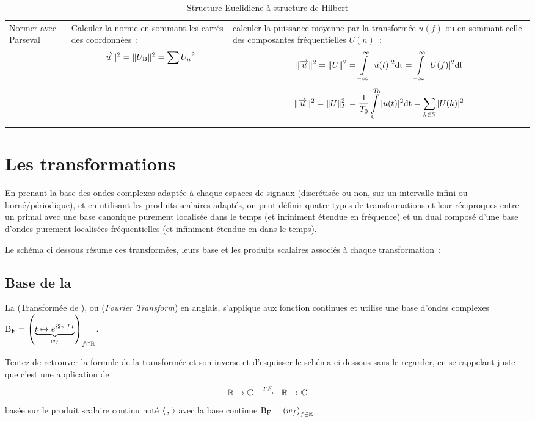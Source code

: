 \begin{table}[!ht]
\begin{tabular}{p{}|p{}|p{}}
  Normer avec Parseval  &  Calculer la norme en sommant les carrés des coordonnées~: $$\|\overrightarrow{u}\|^2=\|U_{\mathrm{B}}\|^2=\sum {U_n}^2$$ &  calculer la puissance moyenne par la transformée $u(f)$ ou en sommant celle des composantes fréquentielles $U(n)$~: $$\|\overrightarrow{u}\|^2=\|U\|^2=\int\limits_{-\infty}^{\infty}{|u(t)|^2\mathrm{d{t}}}=\int\limits_{-\infty}^{\infty}{|U(f)|^2\mathrm{d{f}}} $$  $$\|\overrightarrow{u}\|^2=\|U\|_P^2=\frac{1}{T_0}\int\limits_{0}^{T_0}{|u(t)|^2\mathrm{d{t}}}=\sum\limits_{k\in\mathbb{N}}{|U(k)|^2} $$
\end{tabular}

\caption{Structure Euclidiene à structure de Hilbert}
\label{tab:hilbert}
\end{table}

\section{Les transformations}

En prenant la base des ondes complexes adaptée à chaque espaces de
signaux (discrétisée ou non, sur un intervalle infini ou
borné/périodique), et en utilisant les produits scalaires adaptés, on
peut définir quatre types de transformations et leur réciproques entre
un primal avec une base canonique purement localisée dans le temps (et
infiniment étendue en fréquence) et un dual composé d'une base d'ondes
purement localisées fréquentielles (et infiniment étendue en dans le
temps).

Le schéma ci dessous résume ces transformées, leurs base et les
produits scalaires associés à chaque transformation~:



\subsection{Base de la \TF{}}

La \TF{} (Transformée de \Fourier), ou \FT{} (\emph{Fourier
  Transform}) en anglais, s'applique aux fonction continues et utilise
une base d'ondes complexes
$\mathrm{B_F}=\left(\underbrace{t\mapsto e^{i2\pi\,f\,t}}_{w_f}\right)_{f\in\mathbb{R}}$.

\begin{exercice}
Tentez de retrouver la formule de la transformée et son inverse et d'esquisser le schéma ci-dessous sans le regarder, en se rappelant juste que c'est une application de $$\mathbb{R}\rightarrow\mathbb{C}\;\;\overset{TF}{\longrightarrow}\;\;\mathbb{R}\rightarrow\mathbb{C}$$ basée sur le produit scalaire continu noté $\langle\,,\,\rangle$ avec la base continue $\mathrm{B_F}=\left(w_f\right)_{f\in\mathbb{R}}$
\end{exercice}

